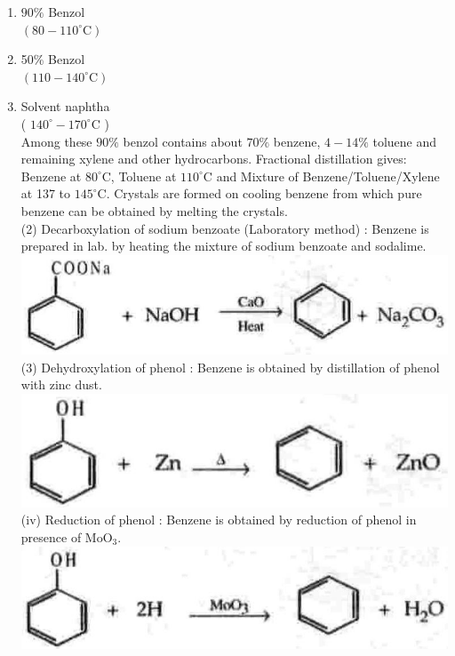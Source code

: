 \documentclass[10pt]{article}
\begin{document}
\begin{enumerate}
  \item $90 \%$ Benzol\\
$\left(80-110^{\circ} \mathrm{C}\right)$
  \item 50\% Benzol\\
$\left(110-140^{\circ} \mathrm{C}\right)$
  \item Solvent naphtha\\
( $140^{\circ}-170^{\circ} \mathrm{C}$ )\\
Among these $90 \%$ benzol contains about $70 \%$ benzene, $4-14 \%$ toluene and remaining xylene and other hydrocarbons. Fractional distillation gives: Benzene at $80^{\circ} \mathrm{C}$, Toluene at $110^{\circ} \mathrm{C}$ and Mixture of Benzene/Toluene/Xylene at 137 to $145^{\circ} \mathrm{C}$. Crystals are formed on cooling benzene from which pure benzene can be obtained by melting the crystals.\\
(2) Decarboxylation of sodium benzoate (Laboratory method) : Benzene is prepared in lab. by heating the mixture of sodium benzoate and sodalime.\\
\includegraphics[max width=\textwidth, center]{2025_01_28_8470952b98110cec3aabg-204}\\
(3) Dehydroxylation of phenol : Benzene is obtained by distillation of phenol with zinc dust.\\
\includegraphics[max width=\textwidth, center]{2025_01_28_8470952b98110cec3aabg-204(2)}\\
(iv) Reduction of phenol : Benzene is obtained by reduction of phenol in presence of $\mathrm{MoO}_{3}$.\\
\includegraphics[max width=\textwidth, center]{2025_01_28_8470952b98110cec3aabg-204(4)}\\

\end{enumerate}
\end{document}
